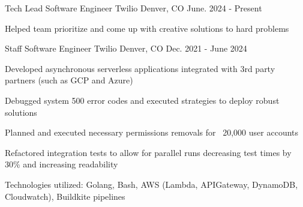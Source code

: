 


\begin{cventries}

\vspace{-.25em}
\cventry
{Tech Lead Software Engineer} %
{Twilio} %
{Denver, CO} %
{June. 2024 - Present} %
{ %
\begin{cvitems}
    \item {Helped team prioritize and come up with creative solutions to hard problems}
\end{cvitems}
}

\vspace{-.25em}
\cventry
{Staff Software Engineer} %
{Twilio} %
{Denver, CO} %
{Dec. 2021 - June 2024} %
{ %
\begin{cvitems}
    \item {Developed asynchronous serverless applications integrated with 3rd party partners (such as GCP and Azure)}
    \item {Debugged system 500 error codes and executed strategies to deploy robust solutions}
    \item {Planned and executed necessary permissions removals for ~20,000 user accounts}
    \item {Refactored integration tests to allow for parallel runs decreasing test times by 30\% and increasing readability}
    \item {Technologies utilized: Golang, Bash, AWS (Lambda, APIGateway, DynamoDB, Cloudwatch), Buildkite pipelines}
\end{cvitems}
}


\end{cventries}

